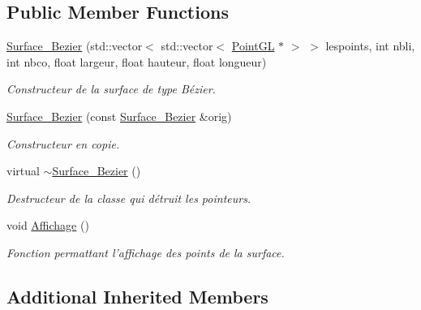 \subsection*{Public Member Functions}
\begin{DoxyCompactItemize}
\item 
\hyperlink{classSurface__Bezier_a63f23108ea58f101ede4190e2391b100}{Surface\-\_\-\-Bezier} (std\-::vector$<$ std\-::vector$<$ \hyperlink{classPointGL}{Point\-G\-L} $\ast$ $>$ $>$ lespoints, int nbli, int nbco, float largeur, float hauteur, float longueur)
\begin{DoxyCompactList}\small\item\em Constructeur de la surface de type Bézier. \end{DoxyCompactList}\item 
\hyperlink{classSurface__Bezier_ad0f538994694a94e963e5531dee52ca1}{Surface\-\_\-\-Bezier} (const \hyperlink{classSurface__Bezier}{Surface\-\_\-\-Bezier} \&orig)
\begin{DoxyCompactList}\small\item\em Constructeur en copie. \end{DoxyCompactList}\item 
\hypertarget{classSurface__Bezier_a23912034f978aa1ca017d3804f649bf8}{virtual \hyperlink{classSurface__Bezier_a23912034f978aa1ca017d3804f649bf8}{$\sim$\-Surface\-\_\-\-Bezier} ()}\label{classSurface__Bezier_a23912034f978aa1ca017d3804f649bf8}

\begin{DoxyCompactList}\small\item\em Destructeur de la classe qui détruit les pointeurs. \end{DoxyCompactList}\item 
\hypertarget{classSurface__Bezier_a58a6e683e23d67861cb83cebd81fb93c}{void \hyperlink{classSurface__Bezier_a58a6e683e23d67861cb83cebd81fb93c}{Affichage} ()}\label{classSurface__Bezier_a58a6e683e23d67861cb83cebd81fb93c}

\begin{DoxyCompactList}\small\item\em Fonction permattant l'affichage des points de la surface. \end{DoxyCompactList}\end{DoxyCompactItemize}
\subsection*{Additional Inherited Members}


